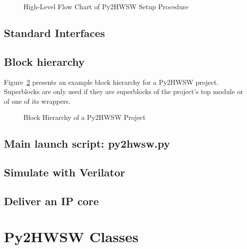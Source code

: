 \documentclass{ug}
\begin{document}
\begin{figure}[H]
  \vspace{-0.7cm}
  \caption{High-Level Flow Chart of Py2HWSW Setup Procedure}
  \label{fig:py2_flow_chart}
\end{figure}

\subsection{Standard Interfaces}
\label{sec:py2_standard_interfaces}


\subsection{Block hierarchy}
\label{sec:py2_block_hierarchy}

Figure~\ref{fig:py2_superblocks_subblocks} presents an example block hierarchy for a Py2HWSW project.
Superblocks are only used if they are superblocks of the project's top module or of one of its wrappers.

\begin{figure}[H]
  \vspace{-0.7cm}
  \caption{Block Hierarchy of a Py2HWSW Project}
  \label{fig:py2_superblocks_subblocks}
\end{figure}

\subsection{Main launch script: py2hwsw.py}
\label{sec:launch_script}


\subsection{Simulate with Verilator}
\label{sec:verilator}


\subsection{Deliver an IP core}
\label{sec:deliver}

%
%
\section{Py2HWSW Classes}
\label{sec:py_classes}
\end{document}
